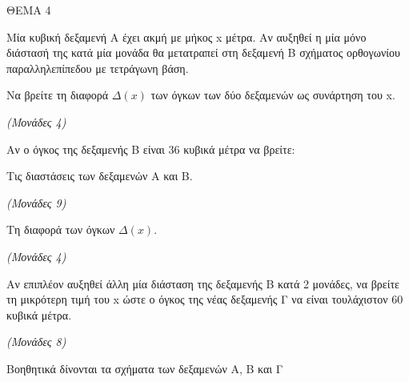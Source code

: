 \documentclass[11pt,a4paper,twoside]{book}
\newcommand{\monades}[1]{\hfill \textit{(Μονάδες #1)}}
\begin{document}
\vspace{4mm}

ΘΕΜΑ 4

Μία κυβική δεξαμενή Α έχει ακμή με μήκος x μέτρα. Αν αυξηθεί η μία μόνο διάστασή της κατά μία μονάδα θα μετατραπεί στη δεξαμενή Β σχήματος ορθογωνίου παραλληλεπίπεδου με τετράγωνη βάση.

\begin{alist}
\item Να βρείτε τη διαφορά $\Delta(x)$ των όγκων των δύο δεξαμενών ως συνάρτηση του x.

\monades{4}

\item Αν ο όγκος της δεξαμενής Β είναι 36 κυβικά μέτρα να βρείτε:
\begin{rlist}
\item Τις διαστάσεις των δεξαμενών Α και Β.

\monades{9}

\item Τη διαφορά των όγκων $\Delta(x)$.

\monades{4}
\end{rlist}

\item Αν επιπλέον αυξηθεί άλλη μία διάσταση της δεξαμενής Β κατά 2 μονάδες, να βρείτε τη μικρότερη τιμή του x ώστε ο όγκος της νέας δεξαμενής Γ να είναι τουλάχιστον 60 κυβικά μέτρα.

\monades{8}
\end{alist}

Βοηθητικά δίνονται τα σχήματα των δεξαμενών Α, Β και Γ
\end{document}
